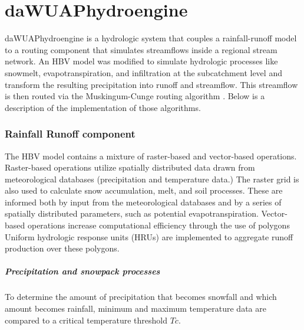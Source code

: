 
\chapter{daWUAPhydroengine}

daWUAPhydroengine is a hydrologic system that couples a rainfall-runoff model to a routing component that simulates streamflows inside a regional stream network. An HBV model \cite{Bergstrom1995, Bergstrom1973} was modified to simulate hydrologic processes like snowmelt, evapotranspiration, and infiltration at the subcatchment level and transform the resulting precipitation into runoff and streamflow. This streamflow is then routed via the Muskingum-Cunge routing algorithm \cite{Chow1988}. Below is a description of the implementation of those algorithms.

\subsection{Rainfall Runoff component}

The HBV model \cite{Bergstrom1995, Bergstrom1973} contains a mixture of raster-based and vector-based operations. Raster-based operations utilize spatially distributed data drawn from meteorological databases (precipitation and temperature data.)  The raster grid is also used to calculate snow accumulation, melt, and soil processes. These are informed both by input from the meteorological databases and by a series of spatially distributed parameters, such as potential evapotranspiration. Vector-based operations increase computational efficiency through the use of polygons Uniform hydrologic response units (HRUs) are implemented to aggregate runoff production over these polygons.

\paragraph{Precipitation and snowpack processes}     

To determine the amount of precipitation that becomes snowfall and which amount becomes rainfall, minimum and maximum temperature data are compared to a critical temperature threshold $Tc$.

